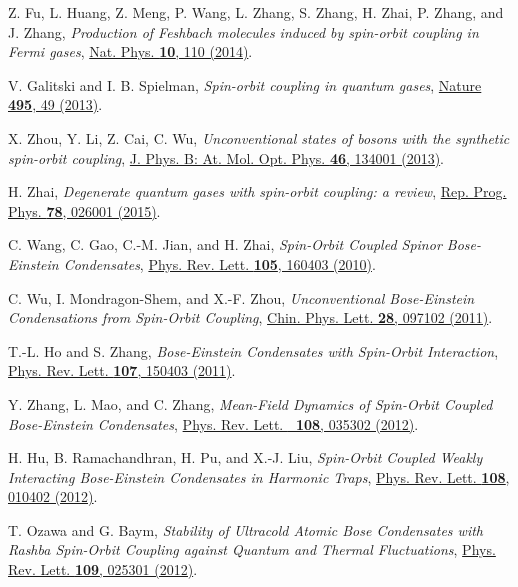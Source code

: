 \documentclass[twocolumn,pra,unsortedaddress,showpacs,floatfix,citeautoscript,nofootinbib]{revtex4-1}
\begin{document}
\begin{thebibliography}{99}
Z. Fu, L. Huang, Z. Meng, P. Wang, L. Zhang, S. Zhang, H. Zhai, P. Zhang, and J.
Zhang, \emph{Production of Feshbach molecules induced by
spin-orbit coupling in Fermi gases},
\href{http://dx.doi.org/10.1038/nphys2824}{Nat. Phys. \textbf{10},
110 (2014)}.

 V. Galitski and I. B. Spielman, \emph{Spin-orbit coupling in quantum gases}, \href{http://dx.doi.org/10.1038/nature11841}%
{Nature \textbf{495}, 49 (2013)}.

 X. Zhou, Y. Li, Z. Cai, C. Wu, \emph{Unconventional states of bosons with the synthetic spin-orbit coupling}, \href{http://dx.doi.org/10.1088/0953-4075/46/13/134001}%
{J. Phys. B: At. Mol. Opt. Phys. \textbf{46}, 134001 (2013)}.

H. Zhai, \emph{Degenerate quantum gases with spin-orbit coupling: a
review},
\href{http://dx.doi.org/10.1088/0034-4885/78/2/026001}{Rep. Prog.
Phys. \textbf{78}, 026001 (2015)}.


 C. Wang, C. Gao, C.-M. Jian, and H. Zhai, \emph{Spin-Orbit Coupled Spinor Bose-Einstein Condensates}, \href{http://dx.doi.org/10.1103/PhysRevLett.105.160403}%
{Phys. Rev. Lett. \textbf{105}, 160403 (2010)}.

 C. Wu, I. Mondragon-Shem, and X.-F. Zhou, \emph{Unconventional Bose-Einstein Condensations from Spin-Orbit Coupling}, \href{http://dx.doi.org/10.1088/0256-307X/28/9/097102}%
{Chin. Phys. Lett. \textbf{28}, 097102 (2011)}.

 T.-L. Ho and S. Zhang, \emph{Bose-Einstein Condensates with Spin-Orbit Interaction}, \href{http://dx.doi.org/10.1103/PhysRevLett.107.150403}%
{Phys. Rev. Lett. \textbf{107}, 150403 (2011)}.

 Y. Zhang, L. Mao, and C. Zhang, \emph{Mean-Field Dynamics of Spin-Orbit Coupled Bose-Einstein Condensates}, \href{http://dx.doi.org/10.1103/PhysRevLett.108.035302}%
{Phys. Rev. Lett. \textbf{\ 108}, 035302 (2012)}.

 H. Hu, B. Ramachandhran, H. Pu, and X.-J. Liu, \emph{Spin-Orbit Coupled Weakly Interacting Bose-Einstein Condensates in Harmonic Traps}, \href{http://dx.doi.org/10.1103/PhysRevLett.108.010402}%
{Phys. Rev. Lett. \textbf{108}, 010402 (2012)}.

 T. Ozawa and G. Baym, \emph{Stability of Ultracold Atomic Bose Condensates with Rashba Spin-Orbit Coupling against Quantum and Thermal Fluctuations}, \href{http://dx.doi.org/10.1103/PhysRevLett.109.025301}%
{Phys. Rev. Lett. \textbf{109}, 025301 (2012)}.


\end{thebibliography}
\end{document}
